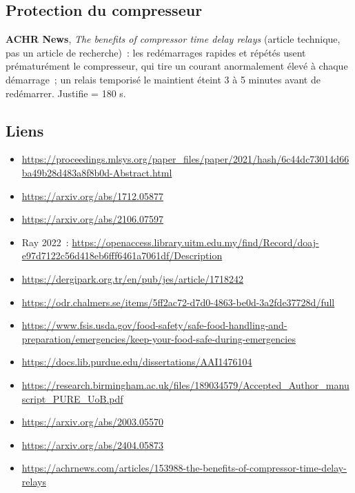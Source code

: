 \subsection{Protection du compresseur}
\textbf{ACHR News}, \textit{The benefits of compressor time delay relays} (article technique, pas un article de recherche)~: les redémarrages rapides et répétés usent prématurément le compresseur, qui tire un courant anormalement élevé à chaque démarrage~; un relais temporisé le maintient éteint 3 à 5 minutes avant de redémarrer. Justifie  = 180 s.

\subsection{Liens}
{\small
\begin{itemize}[itemsep=0.1em]
  \item \url{https://proceedings.mlsys.org/paper_files/paper/2021/hash/6c44dc73014d66ba49b28d483a8f8b0d-Abstract.html}
  \item \url{https://arxiv.org/abs/1712.05877}
  \item \url{https://arxiv.org/abs/2106.07597}
  \item Ray 2022~: \url{https://openaccess.library.uitm.edu.my/find/Record/doaj-e97d7122c56d418eb6fff6461a7061df/Description}
  \item \url{https://dergipark.org.tr/en/pub/jes/article/1718242}
  \item \url{https://odr.chalmers.se/items/5ff2ac72-d7d0-4863-be0d-3a2fde37728d/full}
  \item \url{https://www.fsis.usda.gov/food-safety/safe-food-handling-and-preparation/emergencies/keep-your-food-safe-during-emergencies}
  \item \url{https://docs.lib.purdue.edu/dissertations/AAI1476104}
  \item \url{https://research.birmingham.ac.uk/files/189034579/Accepted_Author_manuscript_PURE_UoB.pdf}
  \item \url{https://arxiv.org/abs/2003.05570}
  \item \url{https://arxiv.org/abs/2404.05873}
  \item \url{https://achrnews.com/articles/153988-the-benefits-of-compressor-time-delay-relays}
\end{itemize}
}

